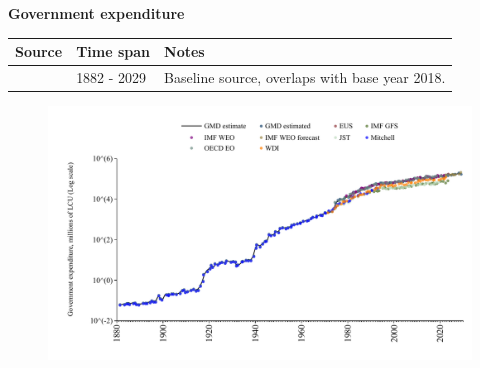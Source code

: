 \documentclass[12pt,a4paper,landscape]{article}
\begin{document}
\begin{adjustbox}{max totalsize={\paperwidth}{\paperheight},center}
\begin{minipage}[t][\textheight][t]{\textwidth}
\vspace*{0.5cm}
{}
\begin{center}
{\Large\bfseries Government expenditure}
\end{center}
\vspace{0.5cm}
\begin{table}[H]
\centering
\small
\begin{tabular}{|l|l|l|}
\hline
\textbf{Source} & \textbf{Time span} & \textbf{Notes} \\
\hline
\rowcolor{white}\cite{GMD_estimated}& 1882 - 2029 &Baseline source, overlaps with base year 2018. \\
\hline
\end{tabular}
\end{table}
\begin{figure}[H]
\centering
\includegraphics[width=\textwidth,height=0.6\textheight,keepaspectratio]{graphs/FIN_govexp.pdf}
\end{figure}
\end{minipage}
\end{adjustbox}
\end{document}
